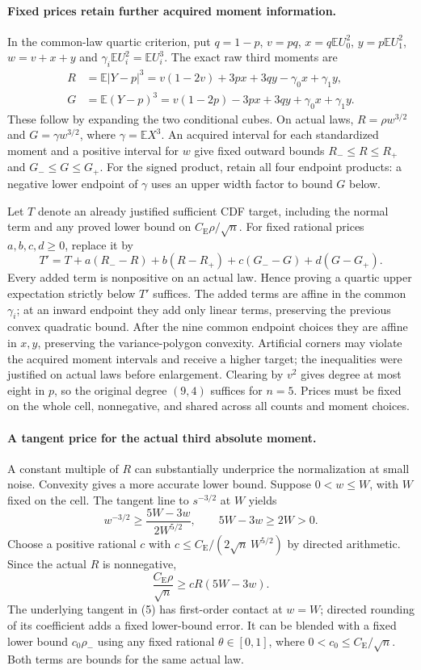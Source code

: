 \documentclass[11pt,a4paper]{article}
\begin{document}
\paragraph{Fixed prices retain further acquired moment information.}
In the common-law quartic criterion, put $q=1-p$, $v=pq$,
$x=q\mathbb E U_0^2$, $y=p\mathbb E U_1^2$, $w=v+x+y$ and
$\gamma_i\mathbb E U_i^2=\mathbb E U_i^3$. The exact raw third moments are
\begin{align*}
 R&=\mathbb E|Y-p|^3
   =v(1-2v)+3px+3qy-\gamma_0x+\gamma_1y,\\
 G&=\mathbb E(Y-p)^3
   =v(1-2p)-3px+3qy+\gamma_0x+\gamma_1y.
\end{align*}
These follow by expanding the two conditional cubes. On actual laws,
$R=\rho w^{3/2}$ and $G=\gamma w^{3/2}$, where $\gamma=\mathbb E X^3$.
An acquired interval for each standardized moment and a positive interval
for $w$ give fixed outward bounds $R_-\le R\le R_+$ and
$G_-\le G\le G_+$. For the signed product, retain all four endpoint
products: a negative lower endpoint of $\gamma$ uses an upper width
factor to bound $G$ below.

Let $T$ denote an already justified sufficient CDF target, including
the normal term and any proved lower bound on $C_{\mathrm E}\rho/\sqrt n$.
For fixed rational prices $a,b,c,d\ge0$, replace it by
\[
 T'=T+a(R_--R)+b(R-R_+)+c(G_--G)+d(G-G_+).
 \tag{4}
\]
Every added term is nonpositive on an actual law. Hence proving a
quartic upper expectation strictly below $T'$ suffices. The added
terms are affine in the common $\gamma_i$; at an inward endpoint they
add only linear terms, preserving the previous convex quadratic bound.
After the nine common endpoint choices they are affine in $x,y$,
preserving the variance-polygon convexity. Artificial corners may
violate the acquired moment intervals and receive a higher target;
the inequalities were justified on actual laws before enlargement.
Clearing by $v^2$ gives degree at most eight in $p$, so the original
degree $(9,4)$ suffices for $n=5$. Prices must be fixed on the whole
cell, nonnegative, and shared across all counts and moment choices.

\paragraph{A tangent price for the actual third absolute moment.}
A constant multiple of $R$ can substantially underprice the
normalization at small noise. Convexity gives a more accurate lower
bound. Suppose $0<w\le W$, with $W$ fixed on the cell. The tangent
line to $s^{-3/2}$ at $W$ yields
\[
 w^{-3/2}\ge\frac{5W-3w}{2W^{5/2}},\qquad 5W-3w\ge2W>0.
 \tag{5}
\]
Choose a positive rational $c$ with
$c\le C_{\mathrm E}/(2\sqrt n\,W^{5/2})$ by directed arithmetic.
Since the actual $R$ is nonnegative,
\[
 \frac{C_{\mathrm E}\rho}{\sqrt n}
       \ge cR(5W-3w).
 \tag{6}
\]
The underlying tangent in (5) has first-order contact at $w=W$;
directed rounding of its coefficient adds a fixed lower-bound error.
It can be blended with a fixed lower bound $c_0\rho_-$ using
any fixed rational $\theta\in[0,1]$, where
$0<c_0\le C_{\mathrm E}/\sqrt n$. Both terms are bounds for the
same actual law.
\end{document}
